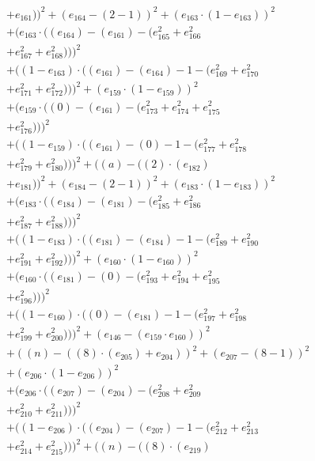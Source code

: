 \documentclass[10pt, a4paper]{article}
\begin{document}
\begin{small}
\begin{align*}
& + e_{161}))^{2} + (e_{164} - (2 - 1))^{2} + (e_{163}  \cdot  (1 - e_{163}))^{2} \\
& + (e_{163}  \cdot  ((e_{164}) - (e_{161}) - (e_{165}^{2} + e_{166}^{2} \\
& + e_{167}^{2} + e_{168}^{2})))^{2} \\
& + ((1 - e_{163})  \cdot  ((e_{161}) - (e_{164}) - 1 - (e_{169}^{2} + e_{170}^{2} \\
& + e_{171}^{2} + e_{172}^{2})))^{2} + (e_{159}  \cdot  (1 - e_{159}))^{2} \\
& + (e_{159}  \cdot  ((0) - (e_{161}) - (e_{173}^{2} + e_{174}^{2} + e_{175}^{2} \\
& + e_{176}^{2})))^{2} \\
& + ((1 - e_{159})  \cdot  ((e_{161}) - (0) - 1 - (e_{177}^{2} + e_{178}^{2} \\
& + e_{179}^{2} + e_{180}^{2})))^{2} + ((a) - ((2)  \cdot  (e_{182}) \\
& + e_{181}))^{2} + (e_{184} - (2 - 1))^{2} + (e_{183}  \cdot  (1 - e_{183}))^{2} \\
& + (e_{183}  \cdot  ((e_{184}) - (e_{181}) - (e_{185}^{2} + e_{186}^{2} \\
& + e_{187}^{2} + e_{188}^{2})))^{2} \\
& + ((1 - e_{183})  \cdot  ((e_{181}) - (e_{184}) - 1 - (e_{189}^{2} + e_{190}^{2} \\
& + e_{191}^{2} + e_{192}^{2})))^{2} + (e_{160}  \cdot  (1 - e_{160}))^{2} \\
& + (e_{160}  \cdot  ((e_{181}) - (0) - (e_{193}^{2} + e_{194}^{2} + e_{195}^{2} \\
& + e_{196}^{2})))^{2} \\
& + ((1 - e_{160})  \cdot  ((0) - (e_{181}) - 1 - (e_{197}^{2} + e_{198}^{2} \\
& + e_{199}^{2} + e_{200}^{2})))^{2} + (e_{146} - (e_{159}  \cdot  e_{160}))^{2} \\
& + ((n) - ((8)  \cdot  (e_{205}) + e_{204}))^{2} + (e_{207} - (8 - 1))^{2} \\
& + (e_{206}  \cdot  (1 - e_{206}))^{2} \\
& + (e_{206}  \cdot  ((e_{207}) - (e_{204}) - (e_{208}^{2} + e_{209}^{2} \\
& + e_{210}^{2} + e_{211}^{2})))^{2} \\
& + ((1 - e_{206})  \cdot  ((e_{204}) - (e_{207}) - 1 - (e_{212}^{2} + e_{213}^{2} \\
& + e_{214}^{2} + e_{215}^{2})))^{2} + ((n) - ((8)  \cdot  (e_{219}) \\

\end{align*}
\end{small}
\end{document}
